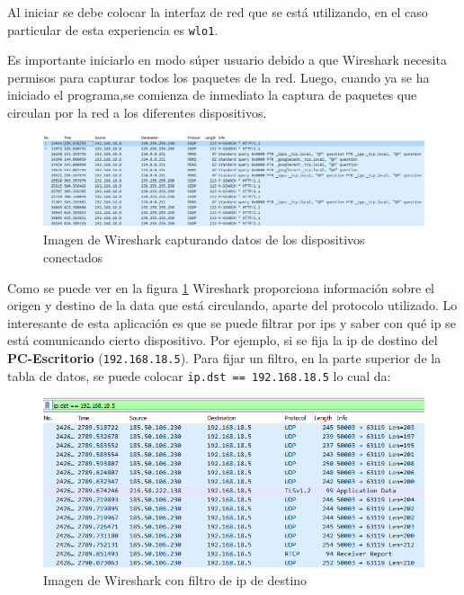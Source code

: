 Al iniciar se debe colocar la interfaz de red que se está utilizando, en el caso particular de esta experiencia es \verb|wlo1|.

\noindent Es importante iniciarlo en modo súper usuario debido a que Wireshark necesita permisos para capturar todos los paquetes de la red. Luego, cuando ya se ha iniciado el programa,se comienza de inmediato la captura de paquetes que circulan por la red a los diferentes dispositivos.

\begin{figure}[!ht]
	\centering
	\includegraphics[scale=0.5]{images/wireshark1.png}
	\caption{Imagen de Wireshark capturando datos de los dispositivos conectados}
	\label{fig:wire1}
\end{figure}


\noindent Como se puede ver en la figura \ref{fig:wire1} Wireshark proporciona información sobre el origen y destino de la data que está circulando, aparte del protocolo utilizado. Lo interesante de esta aplicación es que se puede filtrar por ips y saber con qué ip se está comunicando cierto dispositivo. Por ejemplo, si se fija la ip de destino del \textbf{PC-Escritorio} (\verb|192.168.18.5|). Para fijar un filtro, en la parte superior de la tabla de datos, se puede colocar \verb|ip.dst == 192.168.18.5| lo cual da: 

\begin{figure}[!ht]
	\centering
	\includegraphics[scale=0.6]{images/wireshark2.png}
	\caption{Imagen de Wireshark con filtro de ip de destino}
	\label{fig:wire2}
\end{figure}


